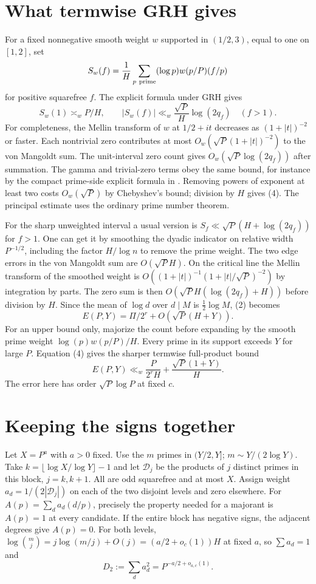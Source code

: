 \documentclass[11pt]{article}
\begin{document}
\section{What termwise GRH gives}
For a fixed nonnegative smooth weight $w$ supported in $(1/2,3)$,
equal to one on $[1,2]$, set
\[
 S_w(f)=\frac1H\sum_{p\ {\rm prime}}(\log p)w(p/P)(f/p)
\]
for positive squarefree $f$. The explicit formula under GRH gives
\[
 S_w(1)\asymp_w P/H,\qquad |S_w(f)|\ll_w
 \frac{\sqrt P}{H}\log(2q_f)\quad (f>1).
 \tag{4}
\]
For completeness, the Mellin transform of $w$ at $1/2+it$ decreases
as $(1+|t|)^{-2}$ or faster. Each nontrivial zero contributes at most
$O_w(\sqrt P(1+|t|)^{-2})$ to the von Mangoldt sum. The unit-interval
zero count gives $O_w(\sqrt P\log(2q_f))$ after summation. The
gamma and trivial-zero terms obey the same bound, for instance by
the compact prime-side explicit formula in \cite[Section 3]{cmqr}.
Removing powers of exponent at least two costs $O_w(\sqrt P)$ by
Chebyshev's bound; division by $H$ gives (4). The principal estimate
uses the ordinary prime number theorem.

For the sharp unweighted interval a usual version is
$S_f\ll\sqrt P(H+\log(2q_f))$ for $f>1$. One can get it by smoothing
the dyadic indicator on relative width $P^{-1/2}$, including the
factor $H/\log n$ to remove the prime weight. The two edge errors
in the von Mangoldt sum are $O(\sqrt P H)$. On the critical line the
Mellin transform of the smoothed weight is
$O((1+|t|)^{-1}(1+|t|/\sqrt P)^{-2})$ by integration by parts.
The zero sum is then $O(\sqrt P H(\log(2q_f)+H))$ before division by
$H$. Since the mean of $\log d$ over $d\mid M$ is $\tfrac12\log M$,
(2) becomes
\[
 E(P,Y)=\Pi/2^r+O\!\left(\sqrt P(H+Y)\right).
 \tag{5}
\]
For an upper bound only, majorize the count before expanding by the
smooth prime weight $\log(p)w(p/P)/H$. Every prime in its support
exceeds $Y$ for large $P$. Equation (4) gives the sharper termwise
full-product bound
\[
 E(P,Y)\ll_w \frac{P}{2^rH}+\frac{\sqrt P(1+Y)}{H}.
 \tag{6}
\]
The error here has order $\sqrt P\log P$ at fixed $c$.

\section{Keeping the signs together}
Let $X=P^a$ with $a>0$ fixed. Use the $m$ primes in $(Y/2,Y]$;
$m\sim Y/(2\log Y)$. Take $k=\lfloor\log X/\log Y\rfloor-1$ and
let $\mathcal D_j$ be the products of $j$ distinct primes in this block,
$j=k,k+1$. All are odd squarefree and at most $X$. Assign weight
$a_d=1/(2|\mathcal D_j|)$ on each of the two disjoint levels and
zero elsewhere. For $A(p)=\sum_d a_d(d/p)$, precisely the property
needed for a majorant is $A(p)=1$ at every candidate. If the entire
block has negative signs, the adjacent degrees give $A(p)=0$. For both
levels, $\log\binom mj=j\log(m/j)+O(j)=(a/2+o_c(1))H$ at fixed $a$,
so $\sum a_d=1$ and
\[
 D_2:=\sum_d a_d^2=P^{-a/2+o_{a,c}(1)}.
 \tag{7}
\]
\end{document}
